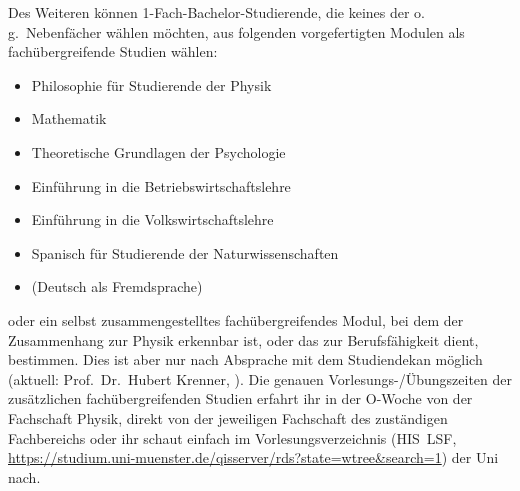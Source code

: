 {\small
Des Weiteren können 1-Fach-Bachelor-Studierende, die keines der o.\,g.\ Nebenfächer wählen möchten, aus folgenden vorgefertigten Modulen als fachübergreifende Studien wählen:
\begin{itemize}[nosep]
	\item Philosophie für Studierende der Physik
	\item Mathematik
	\item Theoretische Grundlagen der Psychologie
	\item Einführung in die Betriebswirtschaftslehre
	\item Einführung in die Volkswirtschaftslehre
	\item Spanisch für Studierende der Naturwissenschaften
	\item (Deutsch als Fremdsprache)
\end{itemize}
oder ein selbst zusammengestelltes fachübergreifendes Modul, bei dem der Zusammenhang zur Physik erkennbar ist, oder das zur Berufsfähigkeit dient, bestimmen.
Dies ist aber nur nach Absprache mit dem Studiendekan möglich (aktuell: Prof.\ Dr.\ Hubert Krenner, ).
Die genauen Vorlesungs-/Übungszeiten der zusätzlichen fachübergreifenden Studien erfahrt ihr in der O-Woche von der Fachschaft Physik, direkt von der jeweiligen Fachschaft des zuständigen Fachbereichs oder ihr schaut einfach im Vorlesungsverzeichnis (HIS~LSF, \url{https://studium.uni-muenster.de/qisserver/rds?state=wtree&search=1}) der Uni nach.
}
